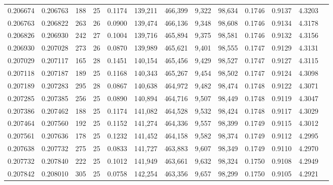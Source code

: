 \begin{tabular}{rrrrrrrrrrrrr}
0.206674 & 0.206763 &   188 &  25 &                                     0.1174 & 139,211 & 466,399 &   9,322 &  98,634 & 0.1746 & 0.9137 & 4.3203 \\
0.206763 & 0.206822 &   263 &  26 &                                     0.0900 & 139,474 & 466,136 &   9,348 &  98,608 & 0.1746 & 0.9134 & 4.3178 \\
0.206826 & 0.206930 &   242 &  27 &                                     0.1004 & 139,716 & 465,894 &   9,375 &  98,581 & 0.1746 & 0.9132 & 4.3156 \\
0.206930 & 0.207028 &   273 &  26 &                                     0.0870 & 139,989 & 465,621 &   9,401 &  98,555 & 0.1747 & 0.9129 & 4.3131 \\
0.207029 & 0.207117 &   165 &  28 &                                     0.1451 & 140,154 & 465,456 &   9,429 &  98,527 & 0.1747 & 0.9127 & 4.3115 \\
0.207118 & 0.207187 &   189 &  25 &                                     0.1168 & 140,343 & 465,267 &   9,454 &  98,502 & 0.1747 & 0.9124 & 4.3098 \\
0.207189 & 0.207283 &   295 &  28 &                                     0.0867 & 140,638 & 464,972 &   9,482 &  98,474 & 0.1748 & 0.9122 & 4.3071 \\
0.207285 & 0.207385 &   256 &  25 &                                     0.0890 & 140,894 & 464,716 &   9,507 &  98,449 & 0.1748 & 0.9119 & 4.3047 \\
0.207386 & 0.207462 &   188 &  25 &                                     0.1174 & 141,082 & 464,528 &   9,532 &  98,424 & 0.1748 & 0.9117 & 4.3029 \\
0.207464 & 0.207560 &   192 &  25 &                                     0.1152 & 141,274 & 464,336 &   9,557 &  98,399 & 0.1749 & 0.9115 & 4.3012 \\
0.207561 & 0.207636 &   178 &  25 &                                     0.1232 & 141,452 & 464,158 &   9,582 &  98,374 & 0.1749 & 0.9112 & 4.2995 \\
0.207638 & 0.207732 &   275 &  25 &                                     0.0833 & 141,727 & 463,883 &   9,607 &  98,349 & 0.1749 & 0.9110 & 4.2970 \\
0.207732 & 0.207840 &   222 &  25 &                                     0.1012 & 141,949 & 463,661 &   9,632 &  98,324 & 0.1750 & 0.9108 & 4.2949 \\
0.207842 & 0.208010 &   305 &  25 &                                     0.0758 & 142,254 & 463,356 &   9,657 &  98,299 & 0.1750 & 0.9105 & 4.2921 \\

\end{tabular}
